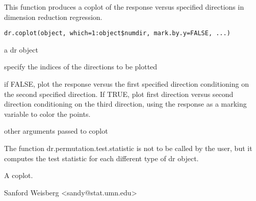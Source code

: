 \begin{Description}\relax
This function produces a coplot of the response versus specified
directions in dimension reduction regression.
\end{Description}
\begin{Usage}
\begin{verbatim}
dr.coplot(object, which=1:object$numdir, mark.by.y=FALSE, ...)
\end{verbatim}
\end{Usage}
\begin{Arguments}
\begin{ldescription}
\item[\code{object}] a dr object 
\item[\code{which}] specify the indices of the directions to be plotted 
\item[\code{mark.by.y}] if FALSE, plot the response versus the first specified
direction conditioning on the second specified direction.  If TRUE, plot
first direction versus second direction conditioning on the third
direction, using the response as a marking variable to color the points.
\item[\code{...}] other arguments passed to coplot 
\end{ldescription}
\end{Arguments}
\begin{Details}\relax
The function dr.permutation.test.statistic is not to be called by the user,
but it computes the test statistic for each different type of dr object.
\end{Details}
\begin{Value}
A coplot.
\end{Value}
\begin{Author}\relax
Sanford Weisberg <sandy@stat.umn.edu>
\end{Author}
\begin{SeeAlso}\relax
{}
\end{SeeAlso}

